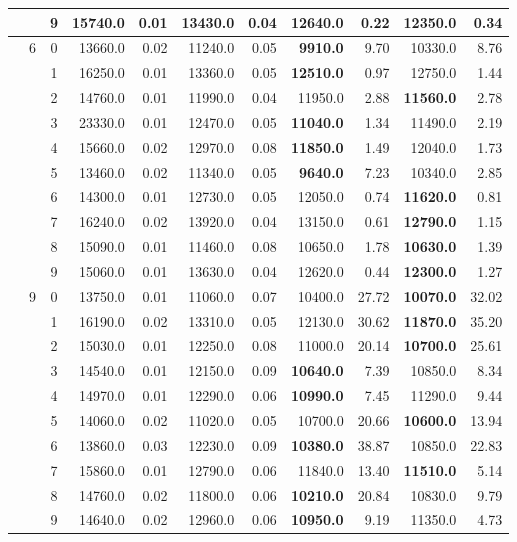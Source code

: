 {\begin{longtable}{ccc|rr|rr|rr|rr}
 &  & 9 & 15740.0 & 0.01 & 13430.0 & 0.04 & 12640.0 & 0.22 & \textbf{12350.0} & 0.34 \\ \hline
 & 6 & 0 & 13660.0 & 0.02 & 11240.0 & 0.05 & \textbf{9910.0} & 9.70 & 10330.0 & 8.76 \\
 &  & 1 & 16250.0 & 0.01 & 13360.0 & 0.05 & \textbf{12510.0} & 0.97 & 12750.0 & 1.44 \\
 &  & 2 & 14760.0 & 0.01 & 11990.0 & 0.04 & 11950.0 & 2.88 & \textbf{11560.0} & 2.78 \\
 &  & 3 & 23330.0 & 0.01 & 12470.0 & 0.05 & \textbf{11040.0} & 1.34 & 11490.0 & 2.19 \\
 &  & 4 & 15660.0 & 0.02 & 12970.0 & 0.08 & \textbf{11850.0} & 1.49 & 12040.0 & 1.73 \\
 &  & 5 & 13460.0 & 0.02 & 11340.0 & 0.05 & \textbf{9640.0} & 7.23 & 10340.0 & 2.85 \\
 &  & 6 & 14300.0 & 0.01 & 12730.0 & 0.05 & 12050.0 & 0.74 & \textbf{11620.0} & 0.81 \\
 &  & 7 & 16240.0 & 0.02 & 13920.0 & 0.04 & 13150.0 & 0.61 & \textbf{12790.0} & 1.15 \\
 &  & 8 & 15090.0 & 0.01 & 11460.0 & 0.08 & 10650.0 & 1.78 & \textbf{10630.0} & 1.39 \\
 &  & 9 & 15060.0 & 0.01 & 13630.0 & 0.04 & 12620.0 & 0.44 & \textbf{12300.0} & 1.27 \\ \hline
 & 9 & 0 & 13750.0 & 0.01 & 11060.0 & 0.07 & 10400.0 & 27.72 & \textbf{10070.0} & 32.02 \\
 &  & 1 & 16190.0 & 0.02 & 13310.0 & 0.05 & 12130.0 & 30.62 & \textbf{11870.0} & 35.20 \\
 &  & 2 & 15030.0 & 0.01 & 12250.0 & 0.08 & 11000.0 & 20.14 & \textbf{10700.0} & 25.61 \\
 &  & 3 & 14540.0 & 0.01 & 12150.0 & 0.09 & \textbf{10640.0} & 7.39 & 10850.0 & 8.34 \\
 &  & 4 & 14970.0 & 0.01 & 12290.0 & 0.06 & \textbf{10990.0} & 7.45 & 11290.0 & 9.44 \\
 &  & 5 & 14060.0 & 0.02 & 11020.0 & 0.05 & 10700.0 & 20.66 & \textbf{10600.0} & 13.94 \\
 &  & 6 & 13860.0 & 0.03 & 12230.0 & 0.09 & \textbf{10380.0} & 38.87 & 10850.0 & 22.83 \\
 &  & 7 & 15860.0 & 0.01 & 12790.0 & 0.06 & 11840.0 & 13.40 & \textbf{11510.0} & 5.14 \\
 &  & 8 & 14760.0 & 0.02 & 11800.0 & 0.06 & \textbf{10210.0} & 20.84 & 10830.0 & 9.79 \\
 &  & 9 & 14640.0 & 0.02 & 12960.0 & 0.06 & \textbf{10950.0} & 9.19 & 11350.0 & 4.73 \\

\end{longtable}}
